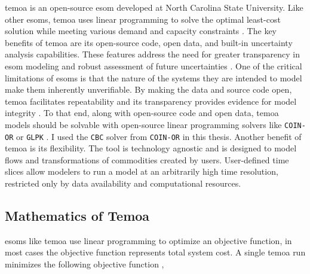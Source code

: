 \gls{temoa} is an open-source \gls{esom} developed at North Carolina State University.
Like other \glspl{esom}, \gls{temoa} uses linear programming to solve the optimal
least-cost solution while meeting various demand and capacity constraints \cite{hunter_modeling_2013}.
The key benefits of \gls{temoa} are its open-source code, open data, and built-in
uncertainty analysis capabilities. These features address the need for greater
transparency in \gls{esom} modeling and robust assessment of future uncertainties
\cite{hunter_modeling_2013}. One of the critical limitations of \glspl{esom} is that
the nature of the systems they are intended to model make them inherently
unverifiable. By making the data and source code open,
\gls{temoa} facilitates repeatability and its transparency provides evidence for
model integrity
\cite{decarolis_case_2012}. To that end, along with open-source code and open data,
\gls{temoa} models should be solvable
with open-source linear programming solvers like \texttt{COIN-OR} \cite{noauthor_coin-or_nodate} or \texttt{GLPK} \cite{noauthor_glpk_nodate}. I used the
\texttt{CBC} solver from \texttt{COIN-OR} \cite{noauthor_cbc_2021} in this thesis.
Another benefit of \gls{temoa} is its flexibility.
The tool is technology agnostic and is designed to model flows and transformations
of commodities created by users.
User-defined time slices allow modelers to run a model at an arbitrarily high
time resolution, restricted only by data availability and computational resources.

\subsection{Mathematics of Temoa}
\glspl{esom} like \gls{temoa} use linear programming to optimize an objective
function, in most cases the objective function represents total system cost.
A single \gls{temoa} run minimizes the following objective function \cite{noauthor_preface_nodate},

